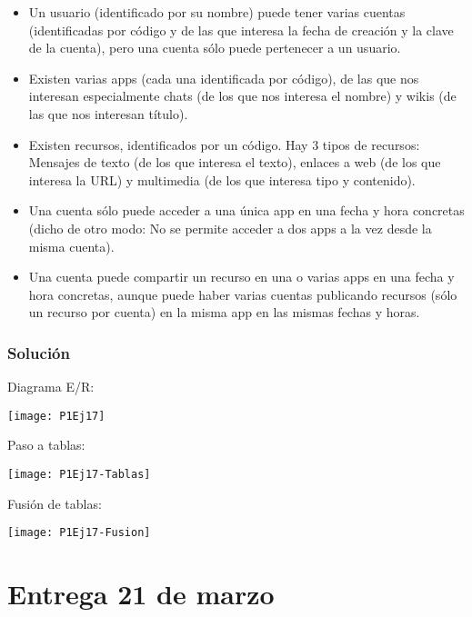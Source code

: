 \begin{itemize}
	\item Un usuario (identificado por su nombre) puede tener varias cuentas (identificadas por código y de las que interesa la fecha de creación y la clave de la cuenta), pero una cuenta sólo puede pertenecer a un usuario.
	\item Existen  varias  apps  (cada  una  identificada  por código),  de las  que nos  interesan especialmente chats (de los que nos interesa el nombre) y wikis (de las que nos interesan título).
	\item Existen recursos, identificados por un código. Hay 3 tipos de recursos: Mensajes de texto (de los que interesa el texto), enlaces a web (de los que interesa la URL) y multimedia (de los que interesa tipo y contenido).
	\item Una cuenta sólo puede acceder a una única app en una fecha y hora concretas (dicho de otro modo: No se permite acceder a dos apps a la vez desde la misma cuenta).
	\item Una cuenta puede compartir un recurso en una o varias apps en una fecha y hora concretas, aunque puede haber varias cuentas publicando recursos (sólo un recurso por cuenta) en la misma app en las mismas fechas y horas.
\end{itemize}

\subsubsection{Solución}

Diagrama E/R\@:

\begin{center}
	\texttt{[image: P1Ej17]}
\end{center}

Paso a tablas:

\begin{center}
	\texttt{[image: P1Ej17-Tablas]}
\end{center}

Fusión de tablas:

\begin{center}
	\texttt{[image: P1Ej17-Fusion]}
\end{center}

\aqsec{\S}

\pagebreak

\section{Entrega 21 de marzo}

